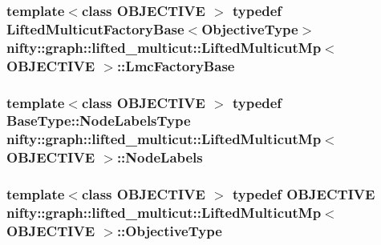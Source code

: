 \subsubsection[{Lmc\+Factory\+Base}]{\setlength{\rightskip}{0pt plus 5cm}template$<$class O\+B\+J\+E\+C\+T\+I\+V\+E $>$ typedef {\bf Lifted\+Multicut\+Factory\+Base}$<${\bf Objective\+Type}$>$ {\bf nifty\+::graph\+::lifted\+\_\+multicut\+::\+Lifted\+Multicut\+Mp}$<$ O\+B\+J\+E\+C\+T\+I\+V\+E $>$\+::{\bf Lmc\+Factory\+Base}}\label{classnifty_1_1graph_1_1lifted__multicut_1_1LiftedMulticutMp_af71b591afe9d847b241acab738c740c4}
\hypertarget{classnifty_1_1graph_1_1lifted__multicut_1_1LiftedMulticutMp_a161412253a683e250bb4c164d40a0d9e}{}
\subsubsection[{Node\+Labels}]{\setlength{\rightskip}{0pt plus 5cm}template$<$class O\+B\+J\+E\+C\+T\+I\+V\+E $>$ typedef {\bf Base\+Type\+::\+Node\+Labels\+Type} {\bf nifty\+::graph\+::lifted\+\_\+multicut\+::\+Lifted\+Multicut\+Mp}$<$ O\+B\+J\+E\+C\+T\+I\+V\+E $>$\+::{\bf Node\+Labels}}\label{classnifty_1_1graph_1_1lifted__multicut_1_1LiftedMulticutMp_a161412253a683e250bb4c164d40a0d9e}
\hypertarget{classnifty_1_1graph_1_1lifted__multicut_1_1LiftedMulticutMp_acce0234d990c40af0002f39dd7e309b7}{}
\subsubsection[{Objective\+Type}]{\setlength{\rightskip}{0pt plus 5cm}template$<$class O\+B\+J\+E\+C\+T\+I\+V\+E $>$ typedef O\+B\+J\+E\+C\+T\+I\+V\+E {\bf nifty\+::graph\+::lifted\+\_\+multicut\+::\+Lifted\+Multicut\+Mp}$<$ O\+B\+J\+E\+C\+T\+I\+V\+E $>$\+::{\bf Objective\+Type}}\label{classnifty_1_1graph_1_1lifted__multicut_1_1LiftedMulticutMp_acce0234d990c40af0002f39dd7e309b7}
\hypertarget{classnifty_1_1graph_1_1lifted__multicut_1_1LiftedMulticutMp_af9810af21796143a4ae499e061e5f80c}{}
